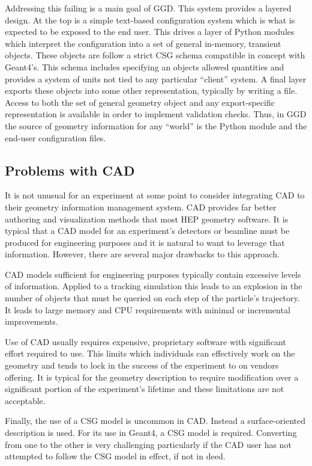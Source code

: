 Addressing this failing is a main goal of GGD.  This system provides a
layered design.  At the top is a simple text-based configuration
system which is what is expected to be exposed to the end user.  This
drives a layer of Python modules which interpret the configuration
into a set of general in-memory, transient objects.  These objects are
follow a strict CSG schema compatible in concept with Geant4's.  This
schema includes specifying an objects allowed quantities and provides
a system of units not tied to any particular ``client'' system.  A
final layer exports these objects into some other representation,
typically by writing a file.  Access to both the set of general
geometry object and any export-specific representation is available in
order to implement validation checks.  Thus, in GGD the source of
geometry information for any ``world'' is the Python module and the
end-user configuration files.

\subsection{Problems with CAD}

It is not unusual for an experiment at some point to consider
integrating CAD to their geometry information management system.  CAD
provides far better authoring and visualization methods that most HEP
geometry software.  It is typical that a CAD model for an experiment's
detectors or beamline must be produced for engineering purposes and it
is natural to want to leverage that information.  However, there are
several major drawbacks to this approach.

CAD models sufficient for engineering purposes typically contain
excessive levels of information.  Applied to a tracking simulation
this leads to an explosion in the number of objects that must be
queried on each step of the particle's trajectory.  It leads to large
memory and CPU requirements with minimal or incremental improvements.

Use of CAD usually requires expensive, proprietary software with
significant effort required to use.  This limits which individuals can
effectively work on the geometry and tends to lock in the success of
the experiment to on vendors offering.  It is typical for the geometry
description to require modification over a significant portion of the
experiment's lifetime and these limitations are not acceptable.

Finally, the use of a CSG model is uncommon in CAD.  Instead a
surface-oriented description is used.  For its use in Geant4, a CSG
model is required.  Converting from one to the other is very
challenging particularly if the CAD user has not attempted to follow
the CSG model in effect, if not in deed.

